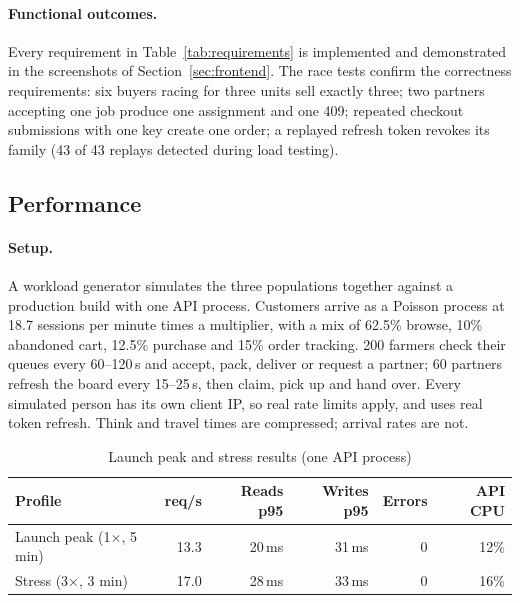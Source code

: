 \documentclass[manuscript,screen,review]{acmart}
\begin{document}
\paragraph{Functional outcomes.} Every requirement in Table~\ref{tab:requirements} is implemented and demonstrated in the screenshots of Section~\ref{sec:frontend}. The race tests confirm the correctness requirements: six buyers racing for three units sell exactly three; two partners accepting one job produce one assignment and one 409; repeated checkout submissions with one key create one order; a replayed refresh token revokes its family (43 of 43 replays detected during load testing).

\subsection{Performance}
\label{sec:performance}

\paragraph{Setup.} A workload generator simulates the three populations together against a production build with one API process. Customers arrive as a Poisson process at 18.7 sessions per minute times a multiplier, with a mix of 62.5\% browse, 10\% abandoned cart, 12.5\% purchase and 15\% order tracking. 200 farmers check their queues every 60--120\,s and accept, pack, deliver or request a partner; 60 partners refresh the board every 15--25\,s, then claim, pick up and hand over. Every simulated person has its own client IP, so real rate limits apply, and uses real token refresh. Think and travel times are compressed; arrival rates are not.

\begin{table}[htbp]
  \caption{Launch peak and stress results (one API process)}
  \label{tab:perf}
  \small
  \begin{tabular}{@{}lrrrrr@{}}
    \toprule
    \textbf{Profile} & \textbf{req/s} & \textbf{Reads p95} & \textbf{Writes p95} & \textbf{Errors} & \textbf{API CPU} \\
    \midrule
    Launch peak (1$\times$, 5 min) & 13.3 & 20\,ms & 31\,ms & 0 & 12\% \\
    Stress (3$\times$, 3 min) & 17.0 & 28\,ms & 33\,ms & 0 & 16\% \\
    \bottomrule
  \end{tabular}
\end{table}
\end{document}
